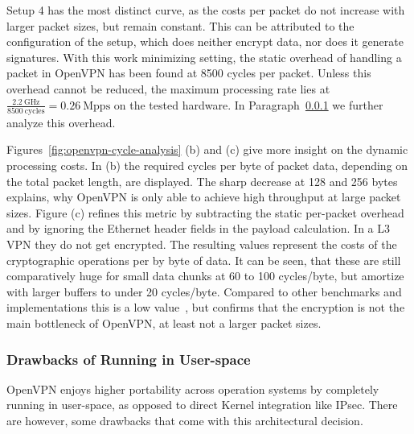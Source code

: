 \documentclass[IN,11pt,twoside,openright,master,english]{tumthesis}
\begin{document}
Setup 4 has the most distinct curve, as the costs per packet do not increase with larger packet sizes, but remain constant. This can be attributed to the configuration of the setup, which does neither encrypt data, nor does it generate signatures. With this work minimizing setting, the static overhead of handling a packet in OpenVPN has been found at 8500 cycles per packet. Unless this overhead cannot be reduced, the maximum processing rate lies at $\frac{2.2\ \textrm{GHz}}{8500\ \textrm{cycles}} = 0.26\ \textrm{Mpps}$ on the tested hardware. In Paragraph~\ref{sec:openvpn-userspace} we further analyze this overhead. 

Figures~\ref{fig:openvpn-cycle-analysis} (b) and (c) give more insight on the dynamic processing costs. In (b) the required cycles per byte of packet data, depending on the total packet length, are displayed. The sharp decrease at 128 and 256 bytes explains, why OpenVPN is only able to achieve high throughput at large packet sizes.
Figure (c) refines this metric by subtracting the static per-packet overhead and by ignoring the Ethernet header fields in the payload calculation. In a L3 VPN they do not get encrypted. The resulting values represent the costs of the cryptographic operations per by byte of data. It can be seen, that these are still comparatively huge for small data chunks at 60 to 100 cycles/byte, but amortize with larger buffers to under 20 cycles/byte. Compared to other benchmarks and implementations this is a low value~\cite{bench.cr.yp.to}, but confirms that the encryption is not the main bottleneck of OpenVPN, at least not a larger packet sizes.



\subsubsection{Drawbacks of Running in User-space}
\label{sec:openvpn-userspace}

OpenVPN enjoys higher portability across operation systems by completely running in user-space, as opposed to direct Kernel integration like IPsec.
There are however, some drawbacks that come with this architectural decision.
\end{document}
